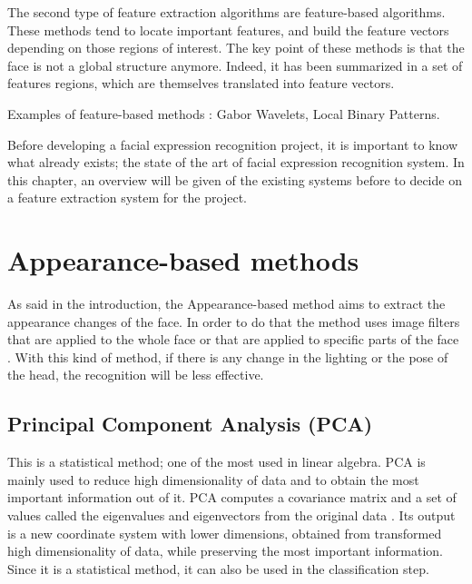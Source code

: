 \noindent The second type of feature extraction algorithms are feature-based algorithms. These methods tend to locate important features, and build the feature vectors depending on those regions of interest. The key point of these methods is that the face is not a global structure anymore. Indeed, it has been summarized in a set of features regions, which are themselves translated into feature vectors.
\vspace{\baselineskip}

\noindent Examples of feature-based methods : Gabor Wavelets, Local Binary Patterns.
\newline

\vspace{\baselineskip}
\noindent Before developing a facial expression recognition project, it is important to know what already exists; the state of the art of facial expression recognition system. In this chapter, an overview will be given of the existing systems before to decide on a feature extraction system for the project.
\newline

\section{Appearance-based methods}

\noindent As said in the introduction, the Appearance-based method aims to extract the appearance changes of the face. In order to do that the method uses image filters that are applied to the whole face or that are applied to specific parts of the face \cite{SHA09}. With this kind of method, if there is any change in the lighting or the pose of the head, the recognition will be less effective.
\newline

\subsection{Principal Component Analysis (PCA)}

\vspace{\baselineskip}
\noindent This is a statistical method; one of the most used in linear algebra. PCA is mainly used to reduce high dimensionality of data and to obtain the most important information out of it. PCA computes a covariance matrix and a set of values called the eigenvalues and eigenvectors from the original data \cite{GAN08}. Its output is a new coordinate system with lower dimensions, obtained from transformed high dimensionality of data, while preserving the most important information.  Since it is a statistical method, it can also be used in the classification step.
\newline

